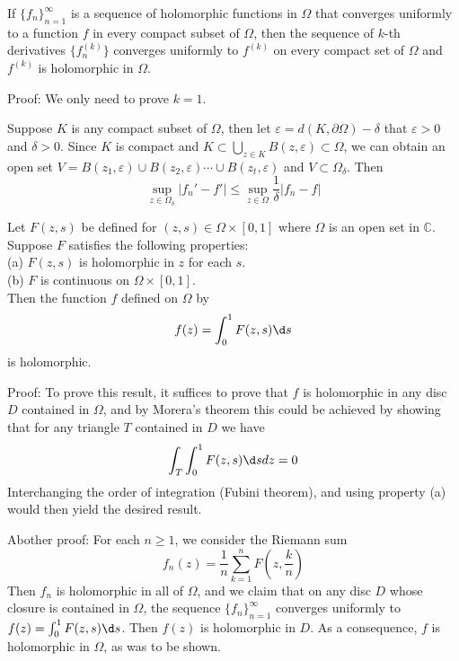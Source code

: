 \documentclass[12pt, oneside]{book}
\begin{document}
\begin{theorem}
    If $\{f_n\}_{n=1}^\infty$ is a sequence of holomorphic functions in $\Omega$ that converges uniformly to a function $f$ in every compact subset of $\Omega$, then the sequence of $k$-th derivatives $\{f_n^{(k)}\}$ converges uniformly to $f^{(k)}$ on every compact set of  $\Omega$ and $f^{(k)}$ is holomorphic in $\Omega$.

    Proof: We only need to prove $k=1$.

    Suppose $K$ is any compact subset of $\Omega$, then let $\varepsilon=d(K,\partial\Omega)-\delta$ that $\varepsilon>0$ and $\delta>0$. Since $K$ is compact and $K \subset \bigcup\limits_{z\in K} B(z,\varepsilon)\subset \Omega$, we can obtain an open set $V=B(z_1,\varepsilon)\cup B(z_2,\varepsilon)\cdots\cup B(z_t,\varepsilon)$ and $V\subset \Omega_\delta$. Then
    $$\sup_{z\in\Omega_\delta}\left|f_n'-f'\right|\leq\sup_{z\in\Omega}\frac{1}{\delta}\left|f_n-f\right|$$

\end{theorem}
\begin{theorem}
    Let $F(z, s)$ be defined for $(z, s)\in\Omega\times[0, 1]$ where $\Omega$ is an open set in $\mathbb{C}$. Suppose $F$ satisfies the following properties:\\
    (a) $F(z, s)$ is holomorphic in $z$ for each $s$.\\
    (b) $F$ is continuous on $\Omega\times[0, 1]$.\\
    Then the function $f$ defined on $\Omega$ by
    $$f(z)=\int_0^1 F(z,s)\d s$$
    is holomorphic.

    Proof: To prove this result, it suffices to prove that $f$ is holomorphic in any disc $D$ contained in $\Omega$, and by Morera's theorem this could be achieved
    by showing that for any triangle $T$ contained in $D$ we have
    $$\int_T\int_0^1F(z,s)\d sdz=0$$
    Interchanging the order of integration (Fubini theorem), and using property (a) would then yield the desired result.

    Abother proof: For each $n \geq 1$, we consider the Riemann sum
    $$f_n(z)=\frac{1}{n}\sum_{k=1}^nF(z,\frac{k}{n})$$
    Then $f_n$ is holomorphic in all of $\Omega$, and we claim that on any disc $D$ whose closure is contained in $\Omega$, the sequence $\{f_n\}_{n=1}^{\infty}$ converges uniformly to $f(z)=\int_0^1 F(z,s)\d s$. Then $f(z)$ is holomorphic in $D$. As a consequence, $f$ is holomorphic in $\Omega$, as was to be shown.
\end{theorem}
\end{document}
